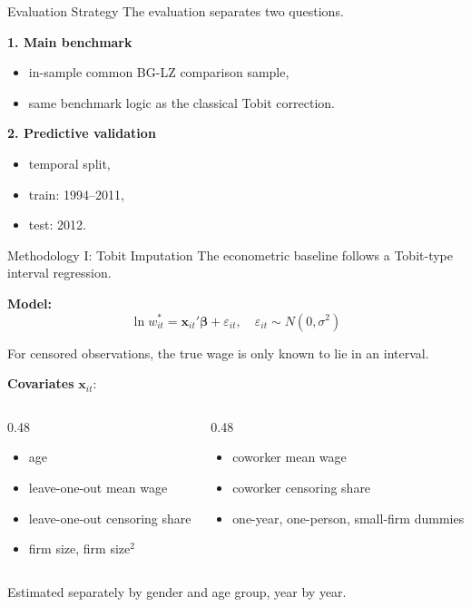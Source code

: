\documentclass[10pt]{beamer}
\begin{document}
\begin{frame}{Evaluation Strategy}
The evaluation separates two questions.

\vspace{0.3cm}
\textbf{1. Main benchmark}
\begin{itemize}
    \item in-sample common BG-LZ comparison sample,
    \item same benchmark logic as the classical Tobit correction.
\end{itemize}

\vspace{0.3cm}
\textbf{2. Predictive validation}
\begin{itemize}
    \item temporal split,
    \item train: 1994--2011,
    \item test: 2012.
\end{itemize}
\end{frame}

\begin{frame}{Methodology I: Tobit Imputation}
The econometric baseline follows a Tobit-type interval regression.

\vspace{0.2cm}
\textbf{Model:}
\[
\ln w_{it}^{*} = \mathbf{x}_{it}' \boldsymbol{\beta} + \varepsilon_{it}, \quad \varepsilon_{it} \sim N(0, \sigma^2)
\]

For censored observations, the true wage is only known to lie in an interval.

\vspace{0.2cm}
\textbf{Covariates} $\mathbf{x}_{it}$:
\begin{columns}[T]
\begin{column}{0.48\textwidth}
\begin{itemize}
    \item age
    \item leave-one-out mean wage
    \item leave-one-out censoring share
    \item firm size, firm size$^2$
\end{itemize}
\end{column}
\begin{column}{0.48\textwidth}
\begin{itemize}
    \item coworker mean wage
    \item coworker censoring share
    \item one-year, one-person, small-firm dummies
\end{itemize}
\end{column}
\end{columns}

\vspace{0.2cm}
Estimated separately by gender and age group, year by year.
\end{frame}
\end{document}
